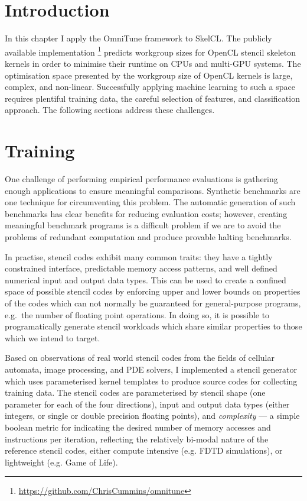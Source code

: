 \section{Introduction}

In this chapter I apply the OmniTune framework to SkelCL. The publicly
available implementation
\footnote{\url{https://github.com/ChrisCummins/omnitune}} predicts
workgroup sizes for OpenCL stencil skeleton kernels in order to
minimise their runtime on CPUs and multi-GPU systems. The optimisation
space presented by the workgroup size of OpenCL kernels is large,
complex, and non-linear. Successfully applying machine learning to
such a space requires plentiful training data, the careful selection
of features, and classification approach. The following sections
address these challenges.




\section{Training}\label{sec:training}

One challenge of performing empirical performance evaluations is
gathering enough applications to ensure meaningful
comparisons. Synthetic benchmarks are one technique for circumventing
this problem. The automatic generation of such benchmarks has clear
benefits for reducing evaluation costs; however, creating meaningful
benchmark programs is a difficult problem if we are to avoid the
problems of redundant computation and produce provable halting
benchmarks.

In practise, stencil codes exhibit many common traits: they have a
tightly constrained interface, predictable memory access patterns, and
well defined numerical input and output data types. This can be used
to create a confined space of possible stencil codes by enforcing
upper and lower bounds on properties of the codes which can not
normally be guaranteed for general-purpose programs, e.g.\ the number
of floating point operations. In doing so, it is possible to
programatically generate stencil workloads which share similar
properties to those which we intend to target.

Based on observations of real world stencil codes from the fields of
cellular automata, image processing, and PDE solvers, I implemented a
stencil generator which uses parameterised kernel templates to produce
source codes for collecting training data. The stencil codes are
parameterised by stencil shape (one parameter for each of the four
directions), input and output data types (either integers, or single
or double precision floating points), and \emph{complexity} --- a
simple boolean metric for indicating the desired number of memory
accesses and instructions per iteration, reflecting the relatively
bi-modal nature of the reference stencil codes, either compute
intensive (e.g. FDTD simulations), or lightweight (e.g. Game of Life).


